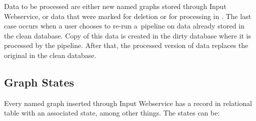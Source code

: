 Data to be processed are either new named graphs stored through Input Webservice, or data that were marked for deletion  or for processing in \FE. The last case occurs when a user chooses to re-run a~pipeline on data already stored in the clean database. Copy of this data is created in the dirty database where it is processed by the pipeline. After that, the processed version of data replaces the original in the clean database.

\subsection{Graph States}
Every named graph inserted through Input Webservice has a record in relational table  with an associated state, among other things. The states can be:

